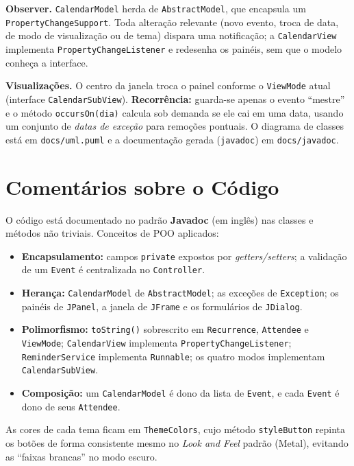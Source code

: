 \documentclass[10pt,a4paper]{article}
\begin{document}
\textbf{Observer.} \texttt{CalendarModel} herda de \texttt{AbstractModel}, que
encapsula um \texttt{PropertyChangeSupport}. Toda alteração relevante (novo evento,
troca de data, de modo de visualização ou de tema) dispara uma notificação;
a \texttt{CalendarView} implementa \texttt{PropertyChangeListener} e redesenha os
painéis, sem que o modelo conheça a interface.

\textbf{Visualizações.} O centro da janela troca o painel conforme o \texttt{ViewMode}
atual (interface \texttt{CalendarSubView}). \textbf{Recorrência:} guarda-se apenas o
evento ``mestre'' e o método \texttt{occursOn(dia)} calcula sob demanda se ele cai em
uma data, usando um conjunto de \emph{datas de exceção} para remoções pontuais. O
diagrama de classes está em \texttt{docs/uml.puml} e a documentação gerada
(\texttt{javadoc}) em \texttt{docs/javadoc}.

\section{Comentários sobre o Código}
O código está documentado no padrão \textbf{Javadoc} (em inglês) nas classes e
métodos não triviais. Conceitos de POO aplicados:
\begin{itemize}
  \item \textbf{Encapsulamento:} campos \texttt{private} expostos por
        \emph{getters/setters}; a validação de um \texttt{Event} é centralizada no
        \texttt{Controller}.
  \item \textbf{Herança:} \texttt{CalendarModel} de \texttt{AbstractModel}; as
        exceções de \texttt{Exception}; os painéis de \texttt{JPanel}, a janela de
        \texttt{JFrame} e os formulários de \texttt{JDialog}.
  \item \textbf{Polimorfismo:} \texttt{toString()} sobrescrito em \texttt{Recurrence},
        \texttt{Attendee} e \texttt{ViewMode}; \texttt{CalendarView} implementa
        \texttt{PropertyChangeListener}; \texttt{ReminderService} implementa
        \texttt{Runnable}; os quatro modos implementam \texttt{CalendarSubView}.
  \item \textbf{Composição:} um \texttt{CalendarModel} é dono da lista de
        \texttt{Event}, e cada \texttt{Event} é dono de seus \texttt{Attendee}.
\end{itemize}
As cores de cada tema ficam em \texttt{ThemeColors}, cujo método \texttt{styleButton}
repinta os botões de forma consistente mesmo no \emph{Look and Feel} padrão (Metal),
evitando as ``faixas brancas'' no modo escuro.
\end{document}
